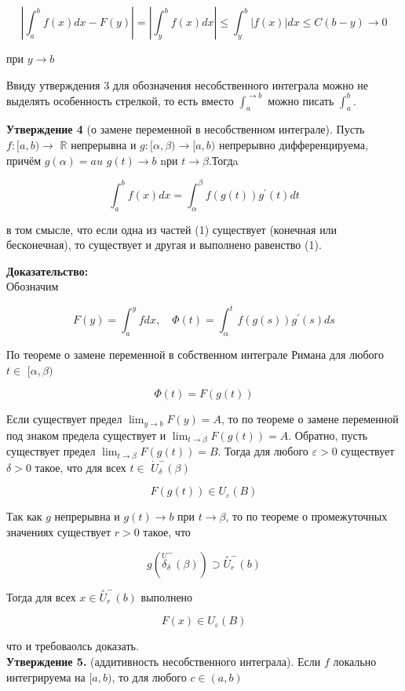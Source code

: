 \documentclass[a4paper,12pt]{article} %
\begin{document}
	$$
	\left|\int_{a}^{b} f(x) d x-F(y)\right|=\left|\int_{y}^{b} f(x) d x\right| \leq \int_{y}^{b}|f(x)| d x \leq C(b-y) \rightarrow 0
	$$
	
	при $y \rightarrow b$
	
	Ввиду утверждения 3 для обозначения несобственного интеграла можно не выделять особенность стрелкой, то есть вместо $\int_{a}^{\rightarrow b}$ можно писать $\int_{a}^{b}$.
	
	\textbf{Утверждение 4} (о замене переменной в несобственном интеграле). Пусть $f:[a, b) \rightarrow$ $\mathbb{R}$ непрерывна и $g:[\alpha, \beta) \rightarrow[a, b)$ непрерывно дифференцируема, причём $g(\alpha)=a u$ $g(t) \rightarrow b$ nри $t \rightarrow \beta$.Тогдa
	
	$$
	\int_{a}^{b} f(x) d x=\int_{\alpha}^{\beta} f(g(t)) g^{\prime}(t) d t
	$$
	
	в том смысле, что если одна из частей (1) существует (конечная или бесконечная), то существует и другая и выполнено равенство (1).
	
	\textbf{Доказательство:\\}
	Обозначим
	
	$$
	F(y)=\int_{a}^{y} f d x, \quad \Phi(t)=\int_{\alpha}^{t} f(g(s)) g^{\prime}(s) d s
	$$
	
	По теореме о замене переменной в собственном интеграле Римана для любого $t \in$ $[\alpha, \beta)$
	
	$$
	\Phi(t)=F(g(t))
	$$
	
	Если существует предел $\lim _{y \rightarrow b} F(y)=A$, то по теореме о замене переменной под знаком предела существует и $\lim _{t \rightarrow \beta} F(g(t))=A$. Обратно, пусть существует предел $\lim _{t \rightarrow \beta} F(g(t))=B$. Тогда для любого $\varepsilon>0$ существует $\delta>0$ такое, что для всех $t \in$ $\dot{U}_{\delta}^{-}(\beta)$
	
	$$
	F(g(t)) \in U_{\varepsilon}(B)
	$$
	
	Так как $g$ непрерывна и $g(t) \rightarrow b$ при $t \rightarrow \beta$, то по теореме о промежуточных значениях существует $r>0$ такое, что
	
	$$
	g\left(\stackrel{U}{\delta}_{\delta}^{-}(\beta)\right) \supset \stackrel{\circ}{U}_{r}^{-}(b)
	$$
	
	Тогда для всех $x \in \stackrel{\circ}{U}_{r}^{-}(b)$ выполнено
	
	$$
	F(x) \in U_{\varepsilon}(B)
	$$
	
	что и требоваолсь доказать.\\
	\textbf{Утверждение 5.} (аддитивность несобственного интеграла). Если $f$ локально интегрируема на $[a, b)$, то для любого $c \in(a, b)$
	
\end{document}
